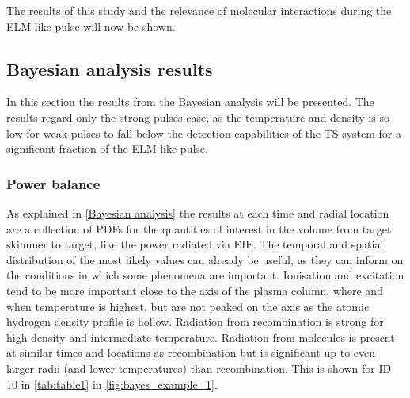 The results of this study and the relevance of molecular interactions during the ELM-like pulse will now be shown.

\subsection{Bayesian analysis results}\label{Bayesian analysis results}
In this section the results from the Bayesian analysis will be presented. The results regard only the strong pulses case, as the temperature and density is so low for weak pulses to fall below the detection capabilities of the TS system for a significant fraction of the ELM-like pulse.

\subsubsection{Power balance}\label{Power balance bayesian}
As explained in \autoref{Bayesian analysis} the results at each time and radial location are a collection of PDFs for the quantities of interest in the volume from target skimmer to target, like the power radiated via EIE. The temporal and spatial distribution of the most likely values can already be useful, as they can inform on the conditions in which some phenomena are important. Ionisation and excitation tend to be more important close to the axis of the plasma column, where and when temperature is highest, but are not peaked on the axis as the atomic hydrogen density profile is hollow. Radiation from recombination is strong for high density and intermediate temperature. Radiation from molecules is present at similar times and locations as recombination but is significant up to even larger radii (and lower temperatures) than recombination. This is shown for ID 10 in \autoref{tab:table1} in \autoref{fig:bayes_example_1}.

